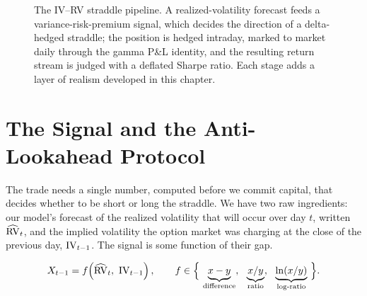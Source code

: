 \begin{figure}[ht]
\centering
{}
\caption{The IV--RV straddle pipeline. A realized-volatility forecast feeds a variance-risk-premium signal, which decides the direction of a delta-hedged straddle; the position is hedged intraday, marked to market daily through the gamma P\&L identity, and the resulting return stream is judged with a deflated Sharpe ratio. Each stage adds a layer of realism developed in this chapter.}
\label{fig:ivrv:pipeline}
\end{figure}

\section{The Signal and the Anti-Lookahead Protocol}
\label{sec:ivrv:signal}

The trade needs a single number, computed before we commit capital, that decides whether to be short or long the straddle. We have two raw ingredients: our model's forecast of the realized volatility that will occur over day $t$, written $\widehat{\operatorname{RV}}_t$, and the implied volatility the option market was charging at the close of the previous day, $\operatorname{IV}_{t-1}$. The signal is some function of their gap.

\begin{equation}
\label{eq:ivrv:signal}
X_{t-1} = f\!\left(\widehat{\RV}_t,\ \IVol_{t-1}\right),
\qquad
f \in \Big\{\, \underbrace{x - y}_{\text{difference}},\ \ \underbrace{x/y}_{\text{ratio}},\ \ \underbrace{\ln(x/y)}_{\text{log-ratio}} \,\Big\}.
\end{equation}

